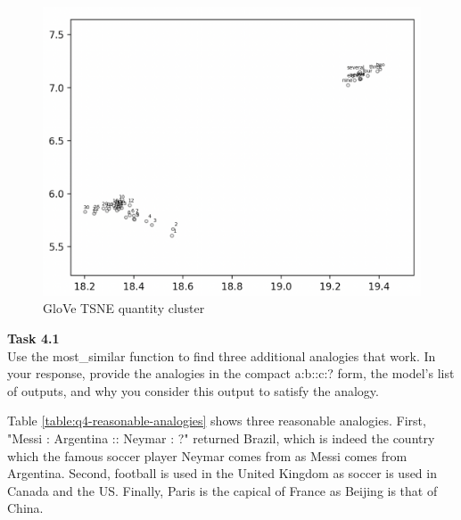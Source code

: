 \documentclass[12pt,article]{article}
\newenvironment{task}[2][Task]
    { \begin{mdframed}[backgroundcolor=gray!20] \textbf{#1 #2} \\}
    {  \end{mdframed}}
\begin{document}
\begin{figure}[H]
    \centering
    \includegraphics[scale=0.5]{glove_tsne_quantity_cluster.png} \par
    \caption{GloVe TSNE quantity cluster}
    \label{fig:q3-tsne-quantity}
\end{figure}
\newpage
\begin{task}{4.1} 
Use the most\_similar function to find three additional analogies that work. In your response, provide the analogies in the compact a:b::c:? form, the model's list of outputs, and why you consider this output to satisfy the analogy.
\end{task}
Table \ref{table:q4-reasonable-analogies} shows three reasonable analogies. First, "Messi : Argentina :: Neymar : ?" returned Brazil, which is indeed the country which the famous soccer player Neymar comes from as Messi comes from Argentina. Second, football is used in the United Kingdom as soccer is used in Canada and the US. Finally, Paris is the capical of France as Beijing is that of China.
\end{document}
